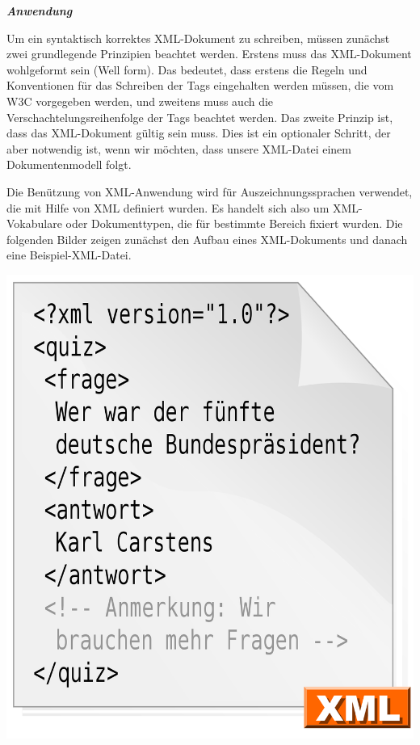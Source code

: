 \textit{\textbf{Anwendung}}

Um ein syntaktisch korrektes XML-Dokument zu schreiben, müssen zunächst zwei grundlegende Prinzipien beachtet werden. Erstens muss das XML-Dokument wohlgeformt sein (Well form). Das bedeutet, dass erstens die Regeln und Konventionen für das Schreiben der Tags eingehalten werden müssen, die vom W3C vorgegeben werden, und zweitens muss auch die Verschachtelungsreihenfolge der Tags beachtet werden. Das zweite Prinzip ist, dass das XML-Dokument gültig sein muss. Dies ist ein optionaler Schritt, der aber notwendig ist, wenn wir möchten, dass unsere XML-Datei einem Dokumentenmodell folgt.

Die Benützung von XML-Anwendung wird für Auszeichnungssprachen verwendet, die mit Hilfe von XML definiert wurden. Es handelt sich also um XML-Vokabulare oder Dokumenttypen, die für bestimmte Bereich fixiert wurden.\cite{helmut36}
Die folgenden Bilder zeigen zunächst den Aufbau eines XML-Dokuments und danach eine Beispiel-XML-Datei.

\begin{center}

\includegraphics[scale=.3]{./images/Xml_datei_Beispiel}
\end{center}
